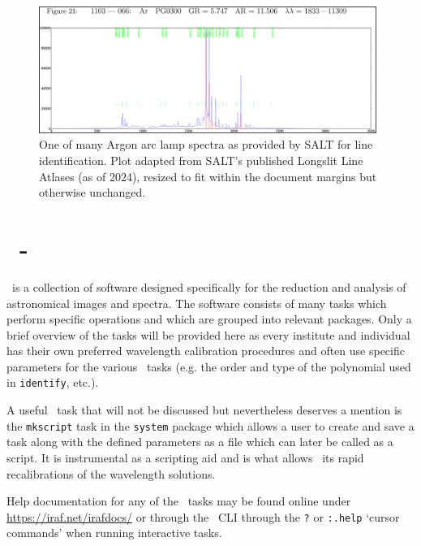 \begin{figure}[t]
    \centering
    \includegraphics[width = 0.98\textwidth]{figures/3_arc_spectrum.png}
    \caption{One of many Argon arc lamp spectra as provided by \gls{SALT} for line identification. Plot adapted from \gls{SALT}'s published Longslit Line Atlases (as of 2024), resized to fit within the document margins but otherwise unchanged.\protect\footnotemark}
    \label{fig:ar_arc_salt}
\end{figure}

\section[\iraf]{\iraf\ - } \label{sec:iraf}

\iraf\ is a collection of software designed specifically for the reduction and analysis of astronomical images and spectra. The software consists of many tasks which perform specific operations and which are grouped into relevant packages. Only a brief overview of the tasks will be provided here as every institute and individual has their own preferred wavelength calibration procedures and often use specific parameters for the various \iraf\ tasks (e.g. the order and type of the polynomial used in \texttt{identify}, etc.).

A useful \iraf\ task that will not be discussed but nevertheless deserves a mention is the \texttt{mkscript} task in the \texttt{system} package which allows a user to create and save a task along with the defined parameters as a file which can later be called as a script. It is instrumental as a scripting aid and is what allows \iraf\ its rapid recalibrations of the wavelength solutions.

Help documentation for any of the \iraf\ tasks may be found online under \url{https://iraf.net/irafdocs/} or through the \iraf\ \gls{CLI} through the \texttt{?} or \texttt{:.help} `cursor commands' when running interactive tasks.

